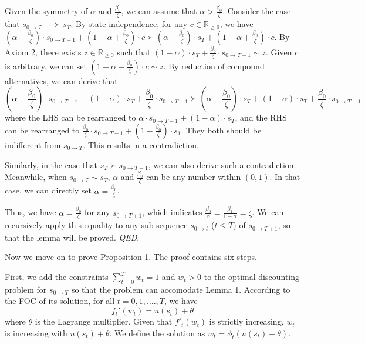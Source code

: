 Given the symmetry of \(\alpha\) and \(\frac{\beta_0}{\zeta}\), we can
assume that \(\alpha > \frac{\beta_0}{\zeta}\). Consider the case that
\(s_{0 \rightarrow T-1} \succ s_T\). By state-independence, for any
\(c\in \mathbb{R}_{\geq 0}\), we have
\((\alpha - \frac{\beta_0}{\zeta})\cdot s_{0\rightarrow T-1} + (1-\alpha+\frac{\beta_0}{\zeta})\cdot c \succ (\alpha - \frac{\beta_0}{\zeta})\cdot s_T + (1-\alpha+\frac{\beta_0}{\zeta})\cdot c\).
By Axiom 2, there exists \(z\in \mathbb{R}_{\geq 0}\) such that
\((1-\alpha)\cdot s_T + \frac{\beta_0}{\zeta}\cdot s_{0\rightarrow T-1}\sim z\).
Given \(c\) is arbitrary, we can set
\((1-\alpha+\frac{\beta_0}{\zeta})\cdot c \sim z\). By reduction of
compound alternatives, we can derive that\[
(\alpha-\frac{\beta_0}{\zeta})\cdot s_{0\rightarrow T-1} +(1-\alpha)\cdot s_T + \frac{\beta_0}{\zeta}\cdot s_{0\rightarrow T-1} \succ (\alpha-\frac{\beta_0}{\zeta})\cdot s_T +(1-\alpha)\cdot s_T + \frac{\beta_0}{\zeta}\cdot s_{0\rightarrow T-1}
\]where the LHS can be rearranged to
\(\alpha\cdot s_{0\rightarrow T-1} + (1-\alpha)\cdot s_T\), and the RHS
can be rearranged to
\(\frac{\beta_0}{\zeta}\cdot s_{0 \rightarrow T-1} + (1-\frac{\beta_0}{\zeta})\cdot s_1\).
They both should be indifferent from \(s_{0\rightarrow T}\). This
results in a contradiction.

Similarly, in the case that \(s_T \succ s_{0 \rightarrow T-1}\), we can
also derive such a contradiction. Meanwhile, when
\(s_{0\rightarrow T}\sim s_T\), \(\alpha\) and \(\frac{\beta_0}{\zeta}\)
can be any number within \((0,1)\). In that case, we can directly set
\(\alpha = \frac{\beta_0}{\zeta}\).

Thus, we have \(\alpha = \frac{\beta_0}{\zeta}\) for any
\(s_{0\rightarrow T+1}\), which indicates
\(\frac{\beta_0}{\alpha}=\frac{\beta_1}{1-\alpha}=\zeta\). We can
recursively apply this equality to any sub-sequence
\(s_{0\rightarrow t}\) (\(t\leq T\)) of \(s_{0\rightarrow T+1}\), so
that the lemma will be proved. \emph{QED}.

Now we move on to prove Proposition 1. The proof contains six steps.

First, we add the constraints \(\sum_{t=0}^T w_t=1\) and \(w_t>0\) to
the optimal discounting problem for \(s_{0\rightarrow T}\) so that the
problem can accomodate Lemma 1. According to the FOC of its solution,
for all \(t=0,1,….,T\), we have\[\tag{A3}
f_t'(w_t)=u(s_t)+\theta
\]where \(\theta\) is the Lagrange multiplier. Given that \(f'_t(w_t)\)
is strictly increasing, \(w_t\) is increasing with \(u(s_t)+\theta\). We
define the solution as \(w_t =\phi_t(u(s_t)+\theta)\).

